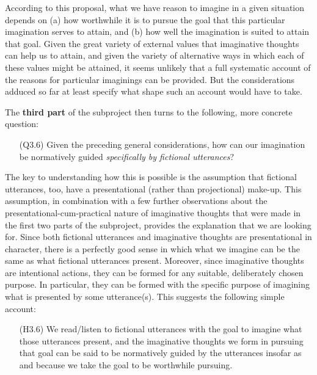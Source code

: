 \noindent According to this proposal, what we have reason to imagine in a given situation depends on (a) how worthwhile it is to pursue the goal that this particular imagination serves to attain, and (b) how well the imagination is suited to attain that goal. Given the great variety of external values that imaginative thoughts can help us to attain, and given the variety of alternative ways in which each of these values might be attained, it seems unlikely that a full systematic account of the reasons for particular imaginings can be provided. But the considerations adduced so far at least specify what shape such an account would have to take.

The \textbf{third part} of the subproject then turns to the following, more concrete question:

\vspace{-.1cm}
\begin{itemize}[leftmargin=2cm]
\item[(Q3.6)] Given the preceding general considerations, how can our imagination be normatively guided \emph{specifically by fictional utterances}?
\end{itemize}
\vspace{-.1cm}
 
\noindent The key to understanding how this is possible is the assumption that fictional utterances, too, have a presentational (rather than projectional) make-up. This assumption, in combination with a few further observations about the presentational-cum-practical nature of imaginative thoughts that were made in the first two parts of the subproject, provides the explanation that we are looking for. Since both fictional utterances and imaginative thoughts are presentational in character, there is a perfectly good sense in which what we imagine can be the same as what fictional utterances present. Moreover, since imaginative thoughts are intentional actions, they can be formed for any suitable, deliberately chosen purpose. In particular, they can be formed with the specific purpose of imagining what is presented by some utterance(s). This suggests the following simple account:

\vspace{-.1cm}
\begin{itemize}[leftmargin=2cm]
\item[(H3.6)] We read/listen to fictional utterances with the goal to imagine what those utterances present, and the imaginative thoughts we form in pursuing that goal can be said to be normatively guided by the utterances insofar as and because we take the goal to be worthwhile pursuing.
\end{itemize}
\vspace{-.1cm}

